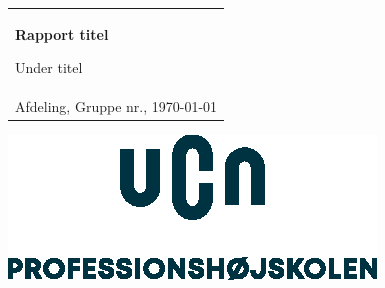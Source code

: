 %
\begin{titlepage}
\pagecolor{ucngrey}\afterpage{\nopagecolor}

\vspace*{\fill}

  \addtolength{\hoffset}{0.5\evensidemargin-0.5\oddsidemargin} %
  \noindent%
  {\color{white}\colorbox{ucnblue}{\begin{tabular}{@{}p{\textwidth}@{}}
    \begin{center}
    \Huge{\textbf{
      Rapport titel%
    }}
    \end{center}
    \begin{center}
      \Large{
        Under titel%
      }
    \end{center}
    \vspace{0.2cm}
   \begin{center}
    {\Large
      Anders Andersen, Alfred Alfredsen, Anne Annesen%
    }\\
    \vspace{0.2cm}
    {\large
      Afdeling, Gruppe nr., \today%
    }
   \end{center}
   \vspace{0.2cm}
   \begin{center}
    {\Large
      Projekt type
    }
   \end{center}
  \end{tabular}}}
  \vfill
  \begin{center}
    \includegraphics[width=0.2\paperwidth]{figures/formalities/UCN-hovedlogo}
  \end{center}
\end{titlepage}
\clearpage